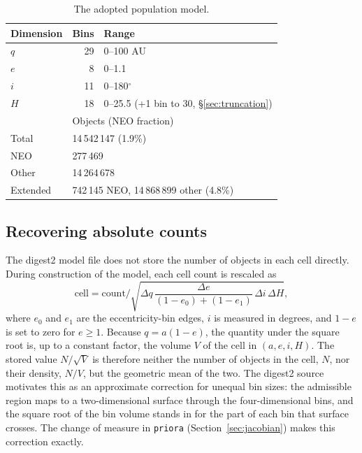 \documentclass[linenumbers,twocolumn]{aastex701}
\newcommand{\priora}{{\tt priora}\xspace} %
\begin{document}
\begin{table}
\centering
\caption{The adopted population model.}
\label{tab:model}
\begin{tabular}{lrl}
\hline
Dimension & Bins & Range \\
\hline
$q$ & 29 & 0--100 AU \\
$e$ & 8  & 0--1.1 \\
$i$ & 11 & 0--180$^\circ$ \\
$H$ & 18 & 0--25.5 (+1 bin to 30, \S\ref{sec:truncation}) \\
\hline
 & \multicolumn{2}{l}{Objects (NEO fraction)} \\
\hline
Total     & \multicolumn{2}{l}{14\,542\,147 \;(1.9\%)} \\
NEO       & \multicolumn{2}{l}{277\,469} \\
Other     & \multicolumn{2}{l}{14\,264\,678} \\
Extended  & \multicolumn{2}{l}{742\,145 NEO, 14\,868\,899 other \;(4.8\%)} \\
\hline
\end{tabular}
\end{table}

\subsection{Recovering absolute counts}
\label{sec:muk}

The digest2 model file does not store the number of objects in each cell
directly. During construction of the model, each cell count is rescaled as
\begin{equation}
\mathrm{cell}=\mathrm{count}\Big/
\sqrt{\Delta q\,\frac{\Delta e}{(1-e_0)+(1-e_1)}\,\Delta i\,\Delta H},
\label{eq:muk}
\end{equation}
where $e_0$ and $e_1$ are the eccentricity-bin edges, $i$ is measured in
degrees, and $1-e$ is set to zero for $e\ge1$. Because $q=a(1-e)$, the
quantity under the square root is, up to a constant factor, the volume $V$
of the cell in $(a,e,i,H)$. The stored value $N/\sqrt{V}$ is therefore
neither the number of objects in the cell, $N$, nor their density, $N/V$,
but the geometric mean of the two. The digest2 source motivates this as an
approximate correction for unequal bin sizes: the admissible region maps
to a two-dimensional surface through the four-dimensional bins, and the
square root of the bin volume stands in for the part of each bin that
surface crosses. The change of measure in \priora
(Section~\ref{sec:jacobian}) makes this correction exactly.
\end{document}
